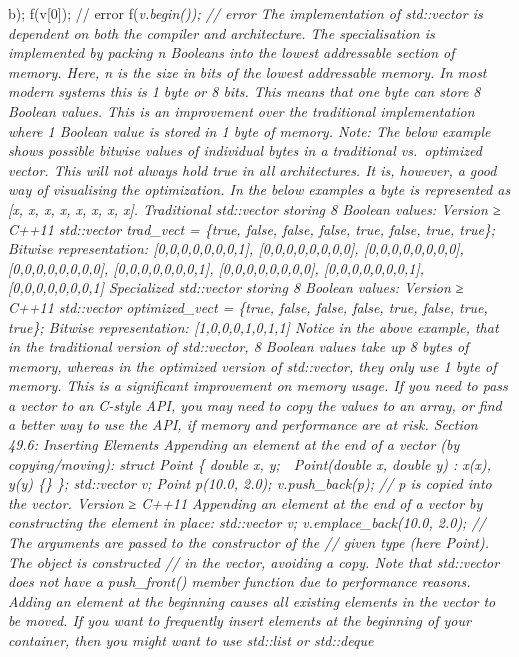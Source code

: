 b); f(v{[}0{]}); // error f(\emph{v.begin()); // error The
implementation of std::vector is dependent on both the compiler and
architecture. The specialisation is implemented by packing n Booleans
into the lowest addressable section of memory. Here, n is the size in
bits of the lowest addressable memory. In most modern systems this is 1
byte or 8 bits. This means that one byte can store 8 Boolean values.
This is an improvement over the traditional implementation where 1
Boolean value is stored in 1 byte of memory. Note: The below example
shows possible bitwise values of individual bytes in a traditional
vs.~optimized vector. This will not always hold true in all
architectures. It is, however, a good way of visualising the
optimization. In the below examples a byte is represented as {[}x, x, x,
x, x, x, x, x{]}. Traditional std::vector storing 8 Boolean values:
Version ≥ C++11 std::vector trad\_vect = \{true, false, false, false,
true, false, true, true\}; Bitwise representation:
{[}0,0,0,0,0,0,0,1{]}, {[}0,0,0,0,0,0,0,0{]}, {[}0,0,0,0,0,0,0,0{]},
{[}0,0,0,0,0,0,0,0{]}, {[}0,0,0,0,0,0,0,1{]}, {[}0,0,0,0,0,0,0,0{]},
{[}0,0,0,0,0,0,0,1{]}, {[}0,0,0,0,0,0,0,1{]} Specialized std::vector
storing 8 Boolean values: Version ≥ C++11 std::vector optimized\_vect =
\{true, false, false, false, true, false, true, true\}; Bitwise
representation: {[}1,0,0,0,1,0,1,1{]} Notice in the above example, that
in the traditional version of std::vector, 8 Boolean values take up 8
bytes of memory, whereas in the optimized version of std::vector, they
only use 1 byte of memory. This is a signiﬁcant improvement on memory
usage. If you need to pass a vector to an C-style API, you may need to
copy the values to an array, or ﬁnd a better way to use the API, if
memory and performance are at risk. Section 49.6: Inserting Elements
Appending an element at the end of a vector (by copying/moving): struct
Point \{ double x, y;  Point(double x, double y) : x(x), y(y) \{\} \};
std::vector v; Point p(10.0, 2.0); v.push\_back(p); // p is copied into
the vector. Version ≥ C++11 Appending an element at the end of a vector
by constructing the element in place: std::vector v;
v.emplace\_back(10.0, 2.0); // The arguments are passed to the
constructor of the // given type (here Point). The object is constructed
// in the vector, avoiding a copy. Note that std::vector does not have a
push\_front() member function due to performance reasons. Adding an
element at the beginning causes all existing elements in the vector to
be moved. If you want to frequently insert elements at the beginning of
your container, then you might want to use std::list or std::deque
}
